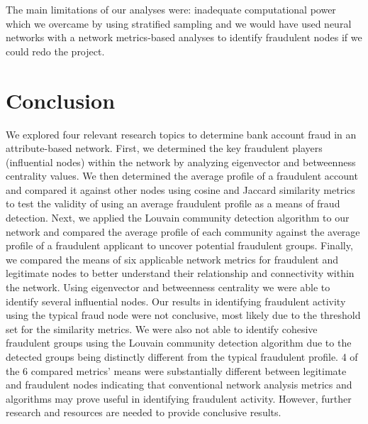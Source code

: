\documentclass{styles/svproc}
\begin{document}
The main limitations of our analyses were: inadequate computational power which we overcame by using stratified sampling and we would have used neural networks with a network metrics-based analyses to identify fraudulent nodes if we could redo the project.

\section{Conclusion}
We explored four relevant research topics to determine bank account fraud in an attribute-based network. First, we determined the key fraudulent players (influential nodes) within the network by analyzing eigenvector and betweenness centrality values. We then determined the average profile of a fraudulent account and compared it against other nodes using cosine and Jaccard similarity metrics to test the validity of using an average fraudulent profile as a means of fraud detection. Next, we applied the Louvain community detection algorithm to our network and compared the average profile of each community against the average profile of a fraudulent applicant to uncover potential fraudulent groups. Finally, we compared the means of six applicable network metrics for fraudulent and legitimate nodes to better understand their relationship and connectivity within the network. Using eigenvector and betweenness centrality we were able to identify several influential nodes. Our results in identifying fraudulent activity using the typical fraud node were not conclusive, most likely due to the threshold set for the similarity metrics. We were also not able to identify cohesive fraudulent groups using the Louvain community detection algorithm due to the detected groups being distinctly different from the typical fraudulent profile. 4 of the 6 compared metrics' means were substantially different between legitimate and fraudulent nodes indicating that conventional network analysis metrics and algorithms may prove useful in identifying fraudulent activity. However, further research and resources are needed to provide conclusive results. 
\end{document}

